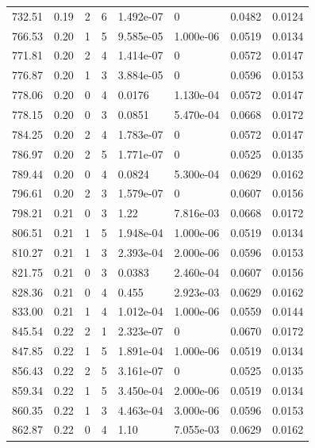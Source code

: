 \documentclass[preview]{standalone}
\begin{document}
{{{\begin{tabular}{L{1.2cm}C{1.2cm} C{0.3cm}C{0.5cm} C{1.4cm}C{1.4cm} C{1.4cm}C{1.4cm}}
  732.51  &  0.19  & 2     &  6 &  1.492e-07  & 0  & 0.0482 &  0.0124   \\ 
  766.53  &  0.20  & 1     &  5 &  9.585e-05  & 1.000e-06  & 0.0519 &  0.0134   \\ 
  771.81  &  0.20  & 2     &  4 &  1.414e-07  & 0  & 0.0572 &  0.0147   \\ 
  776.87  &  0.20  & 1     &  3 &  3.884e-05  & 0  & 0.0596 &  0.0153   \\ 
  778.06  &  0.20  & 0     &  4 &  0.0176  & 1.130e-04  & 0.0572 &  0.0147   \\ 
  778.15  &  0.20  & 0     &  3 &  0.0851  & 5.470e-04  & 0.0668 &  0.0172   \\ 
  784.25  &  0.20  & 2     &  4 &  1.783e-07  & 0  & 0.0572 &  0.0147   \\ 
  786.97  &  0.20  & 2     &  5 &  1.771e-07  & 0  & 0.0525 &  0.0135   \\ 
  789.44  &  0.20  & 0     &  4 &  0.0824  & 5.300e-04  & 0.0629 &  0.0162   \\ 
  796.61  &  0.20  & 2     &  3 &  1.579e-07  & 0  & 0.0607 &  0.0156   \\ 
  798.21  &  0.21  & 0     &  3 &  1.22  & 7.816e-03  & 0.0668 &  0.0172   \\ 
  806.51  &  0.21  & 1     &  5 &  1.948e-04  & 1.000e-06  & 0.0519 &  0.0134   \\ 
  810.27  &  0.21  & 1     &  3 &  2.393e-04  & 2.000e-06  & 0.0596 &  0.0153   \\ 
  821.75  &  0.21  & 0     &  3 &  0.0383  & 2.460e-04  & 0.0607 &  0.0156   \\ 
  828.36  &  0.21  & 0     &  4 &  0.455  & 2.923e-03  & 0.0629 &  0.0162   \\ 
  833.00  &  0.21  & 1     &  4 &  1.012e-04  & 1.000e-06  & 0.0559 &  0.0144   \\ 
  845.54  &  0.22  & 2     &  1 &  2.323e-07  & 0  & 0.0670 &  0.0172   \\ 
  847.85  &  0.22  & 1     &  5 &  1.891e-04  & 1.000e-06  & 0.0519 &  0.0134   \\ 
  856.43  &  0.22  & 2     &  5 &  3.161e-07  & 0  & 0.0525 &  0.0135   \\ 
  859.34  &  0.22  & 1     &  5 &  3.450e-04  & 2.000e-06  & 0.0519 &  0.0134   \\ 
  860.35  &  0.22  & 1     &  3 &  4.463e-04  & 3.000e-06  & 0.0596 &  0.0153   \\ 
  862.87  &  0.22  & 0     &  4 &  1.10  & 7.055e-03  & 0.0629 &  0.0162   \\ 

\end{tabular}}}}
\end{document}
